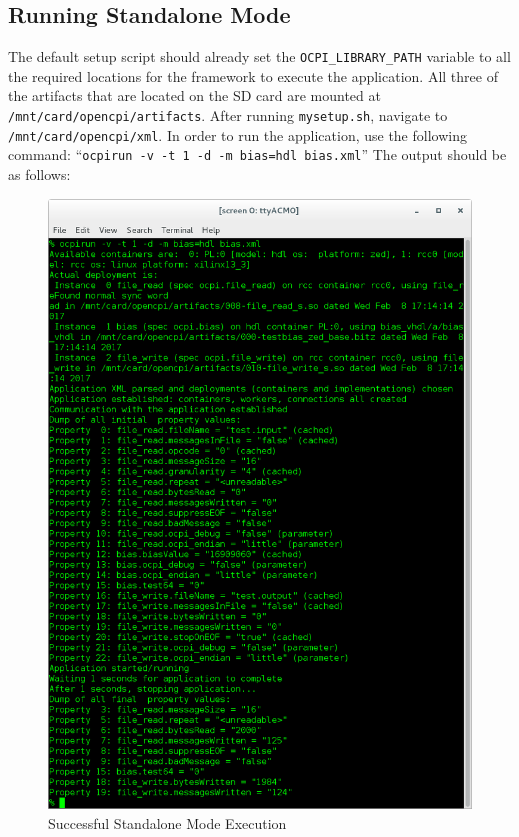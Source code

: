 \subsection{Running Standalone Mode}
\begin{flushleft}
The default setup script should already set the \texttt{OCPI\_LIBRARY\_PATH} variable to all the required locations for the framework to execute the application.  All three of the artifacts that are located on the SD card are mounted at \texttt{/mnt/card/opencpi/artifacts}.  After running \texttt{mysetup.sh}, navigate to \texttt{/mnt/card/opencpi/xml}.  In order to run the application, use the following command: ``\texttt{ocpirun -v -t 1 -d -m bias=hdl bias.xml}'' The output should be as follows:
\end{flushleft}
\begin{figure}[H]
	\centerline{\includegraphics[scale=0.5]{zed_bias}}
	\caption{Successful Standalone Mode Execution}
 \label{fig:standBias}
\end{figure}

